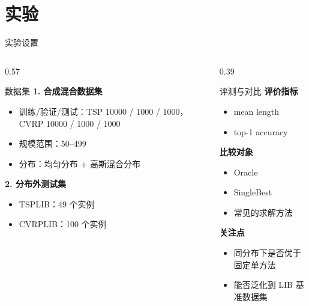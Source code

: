 \documentclass{ctexbeamer}
\begin{document}
\section{实验}

\begin{frame}{实验设置}
  \scriptsize
  \begin{columns}[T,totalwidth=\textwidth]
    \begin{column}{0.57\textwidth}
      \begin{block}{数据集}
        \textbf{1. 合成混合数据集}
        \begin{itemize}
          \item 训练/验证/测试：TSP 10000 / 1000 / 1000，CVRP 10000 / 1000 / 1000
          \item 规模范围：50--499
          \item 分布：均匀分布 + 高斯混合分布
        \end{itemize}

        \vspace{0.2em}
        \textbf{2. 分布外测试集}
        \begin{itemize}
          \item TSPLIB：49 个实例
          \item CVRPLIB：100 个实例
        \end{itemize}
      \end{block}
    \end{column}
    \begin{column}{0.39\textwidth}
      \begin{block}{评测与对比}
        \textbf{评价指标}
        \begin{itemize}
          \item mean length
          \item top-1 accuracy
        \end{itemize}

        \vspace{0.2em}
        \textbf{比较对象}
        \begin{itemize}
          \item Oracle
          \item SingleBest
          \item 常见的求解方法
        \end{itemize}

        \vspace{0.2em}
        \textbf{关注点}
        \begin{itemize}
          \item 同分布下是否优于固定单方法
          \item 能否泛化到 LIB 基准数据集
        \end{itemize}
      \end{block}
    \end{column}
  \end{columns}
\end{frame}
\end{document}
